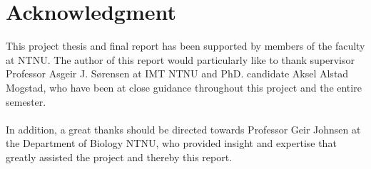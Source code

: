 \chapter*{Acknowledgment}
This project thesis and final report has been supported by members of the faculty at NTNU. The author of this report would particularly like to thank supervisor Professor Asgeir J. S{\o}rensen at IMT NTNU and PhD. candidate Aksel Alstad Mogstad, who have been at close guidance throughout this project and the entire semester. 
\\\\
In addition, a great thanks should be directed towards Professor Geir Johnsen at the Department of Biology NTNU, who provided insight and expertise that greatly assisted the project and thereby this report. 

